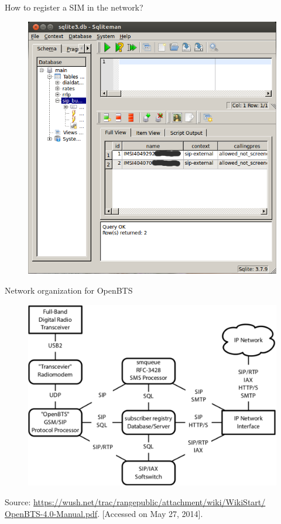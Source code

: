 \documentclass{beamer}
\begin{document}
  \begin{frame}{How to register a SIM in the network?}
    \begin{figure}
      \centering
      \includegraphics[width=0.7\linewidth]{img/sipbuddies}
    \end{figure}
  \end{frame}

  \begin{frame}{Network organization for OpenBTS}
    \begin{minipage}[t][0.8\textheight][t]{\textwidth}
      \begin{figure}
	\centering
	\includegraphics[width=0.8\linewidth]{img/btsSimple}
      \end{figure}
      \vfill
      \tiny{Source: \url{https://wush.net/trac/rangepublic/attachment/wiki/WikiStart/
OpenBTS-4.0-Manual.pdf}. [Accessed on May 27, 2014].}
   \end{minipage}
  \end{frame}
  
\end{document}

